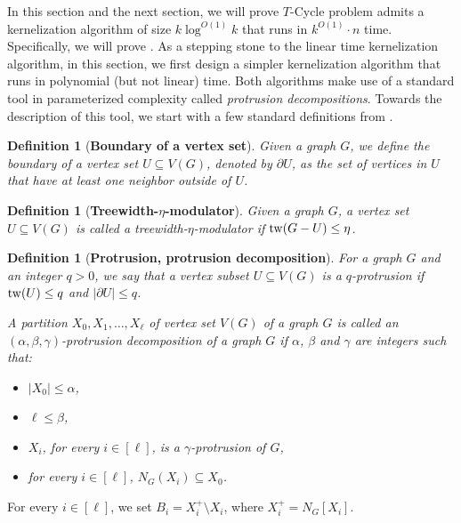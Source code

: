 \documentclass{article}
\newcommand{\tw}{{\rm tw}}
\newtheorem{definition}[theorem]{Definition}
\numberwithin{claimcounter}{lemma}
\begin{document}
In this section and the next section, we will prove  {\sc $T$-Cycle} problem admits a kernelization algorithm of size $k \log^{O(1)}k$ that runs in $k^{O(1)}\cdot n$ time. Specifically, we will prove .  As a stepping stone to the linear time kernelization algorithm, in this section, we first design a simpler kernelization algorithm that runs in polynomial (but not linear) time. Both algorithms make use of a standard  tool in parameterized complexity called \emph{protrusion decompositions}. Towards the description of this tool, we start with a few standard definitions from \cite{kernelbook}.

\begin{definition}[\textbf{Boundary of a vertex set}]
Given a graph $G$, we define the \emph{boundary} of a vertex set $U \subseteq V(G)$, denoted by $\partial U$, as the set of vertices in $U$ that have at least one neighbor outside of $U$.    
\end{definition}


\begin{definition}[\textbf{Treewidth-$\eta$-modulator}]
    Given a graph $G$, a vertex set $U \subseteq V(G)$ is called a treewidth-$\eta$-modulator if $\tw(G-U) \leq \eta$.
\end{definition}



\begin{definition}[\textbf{Protrusion, protrusion decomposition}]
For a graph $G$ and an integer $q>0$, we say that a vertex subset $U\subseteq V(G)$ is a \emph{$q$-protrusion} if $\tw(U) \leq q$ and $|\partial U| \leq q$.    

A partition $X_0,X_1,\dots,X_\ell$  of vertex set $V(G)$ of a graph $G$ is called an \emph{$(\alpha,\beta,\gamma)$-protrusion decomposition} of a graph $G$ if $\alpha$, $\beta$ and $\gamma$ are integers such that:

\begin{itemize}
    \item $|X_0| \leq \alpha$,
    \item $\ell \leq \beta$,
    \item $X_i$, for every $i \in [\ell]$, is a $\gamma$-protrusion of $G$,
    \item for every $i \in [\ell]$, $N_G(X_i) \subseteq X_0 $.
\end{itemize}
\end{definition}


For every $i \in [\ell]$, we set $B_i = X_i^+ \setminus X_i$, where $X_i^+ = N_G[X_i]$.
\end{document}
